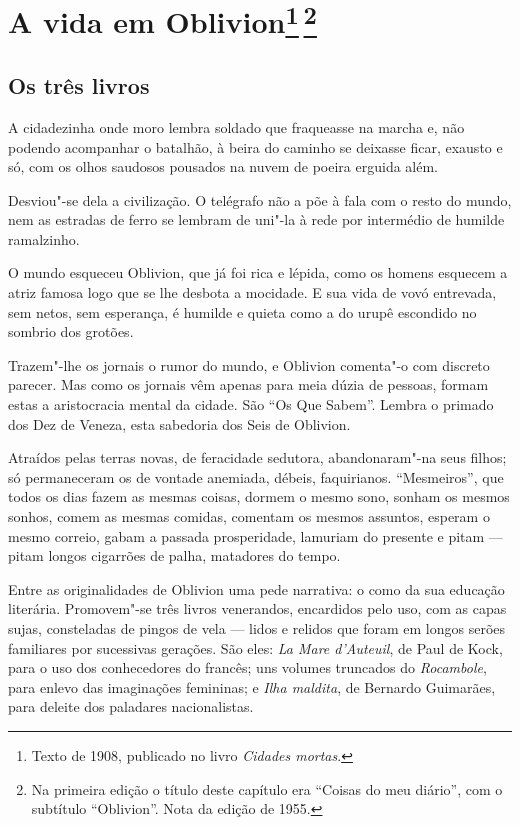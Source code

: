\chapter{A vida em Oblivion\footnote[*]{Texto de 1908, publicado no livro \emph{Cidades mortas}.}\,\footnote[**]{Na primeira edição o
  título deste capítulo era ``Coisas do meu diário'', com o subtítulo
  ``Oblivion''. Nota da edição de 1955.}}

\section*{Os três livros}

\noindent{}A cidadezinha onde moro lembra soldado que fraqueasse na marcha e, não
podendo acompanhar o batalhão, à beira do caminho se deixasse ficar,
exausto e só, com os olhos saudosos pousados na nuvem de poeira erguida
além.

Desviou"-se dela a civilização. O telégrafo não a põe à fala com o resto
do mundo, nem as estradas de ferro se lembram de uni"-la à rede por
intermédio de humilde ramalzinho.

O mundo esqueceu Oblivion, que já foi rica e lépida, como os homens
esquecem a atriz famosa logo que se lhe desbota a mocidade. E sua vida
de vovó entrevada, sem netos, sem esperança, é humilde e quieta como a
do urupê escondido no sombrio dos grotões.

Trazem"-lhe os jornais o rumor do mundo, e Oblivion comenta"-o com
discreto parecer. Mas como os jornais vêm apenas para meia dúzia de
pessoas, formam estas a aristocracia mental da cidade. São ``Os Que
Sabem''. Lembra o primado dos Dez de Veneza, esta sabedoria dos Seis de
Oblivion.

Atraídos pelas terras novas, de feracidade sedutora, abandonaram"-na seus
filhos; só permaneceram os de vontade anemiada, débeis, faquirianos.
``Mesmeiros'', que todos os dias fazem as mesmas coisas, dormem o mesmo
sono, sonham os mesmos sonhos, comem as mesmas comidas, comentam os
mesmos assuntos, esperam o mesmo correio, gabam a passada prosperidade,
lamuriam do presente e pitam --- pitam longos cigarrões de palha,
matadores do tempo.

Entre as originalidades de Oblivion uma pede narrativa: o como da sua
educação literária. Promovem"-se três livros venerandos, encardidos pelo
uso, com as capas sujas, consteladas de pingos de vela --- lidos e
relidos que foram em longos serões familiares por sucessivas gerações.
São eles: \emph{La Mare d'Auteuil}, de Paul de Kock, para o uso dos
conhecedores do francês; uns volumes truncados do \emph{Rocambole}, para
enlevo das imaginações femininas; e \emph{Ilha maldita}, de Bernardo
Guimarães, para deleite dos paladares nacionalistas.

